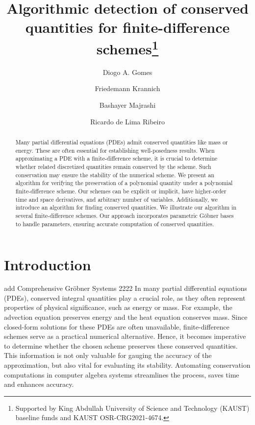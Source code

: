 \documentclass[runningheads]{llncs}
\newcommand{\1}{\chi}
\begin{document}
%
\title{Algorithmic detection of conserved quantities for finite-difference schemes\thanks{Supported by King Abdullah University of Science and Technology (KAUST) baseline funds and KAUST OSR-CRG2021-4674.}}
%
%
\author{Diogo A. Gomes \and
	Friedemann Krannich \and
	Bashayer Majrashi \and
	Ricardo de Lima Ribeiro}
%
%
%
\maketitle
%
\begin{abstract}
	Many partial differential equations (PDEs) admit conserved quantities like mass or energy. These are often essential for establishing well-posedness results. When approximating a PDE with a finite-difference scheme, it is crucial to determine whether related discretized quantities remain conserved by the scheme. Such conservation may ensure the stability of the numerical scheme. We present an algorithm for verifying the preservation of a polynomial quantity under a polynomial finite-difference scheme. Our schemes can be explicit or implicit, have higher-order time and space derivatives, and  arbitrary number of variables. Additionally, we introduce an algorithm for finding conserved quantities. We illustrate our algorithm in several finite-difference schemes. Our approach incorporates parametric G\"obner bases to handle parameters, ensuring accurate computation of conserved quantities.
	
	
\end{abstract}

\section{Introduction}
{\color{blue} add 
Comprehensive Gr{\"o}bner Systems 2222
}
In many partial differential equations (PDEs), conserved integral quantities play a crucial role, as they often represent properties of physical significance, such as energy or mass. For example, the advection equation preserves energy and the heat equation conserves mass. 
Since closed-form solutions for these PDEs are often unavailable, finite-difference schemes serve as a practical numerical alternative. Hence, it becomes imperative to determine whether the chosen scheme preserves these conserved quantities. This information is not only valuable for gauging the accuracy of the approximation, but also vital for evaluating its stability. Automating conservation computations in computer algebra systems streamlines the process, saves time and enhances accuracy.
\end{document}
